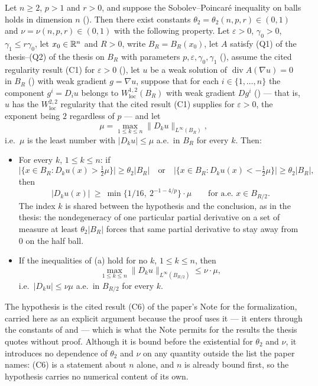 \begin{lemma}[Lemma 3.2]
Let $n\ge2$, $p>1$ and $r>0$, and suppose the Sobolev--Poincar\'e inequality on balls holds in dimension $n$
().  Then there exist constants
$\theta_2=\theta_2(n,p,r)\in(0,1)$ and $\nu=\nu(n,p,r)\in(0,1)$ with the
following property.  Let $\varepsilon>0$, $\gamma_0>0$, $\gamma_1\le r\gamma_0$,
let $x_0\in\mathbb{R}^n$ and $R>0$, write $B_R=B_R(x_0)$,
let $A$ satisfy (Q1) of the thesis--(Q2) of the thesis on $B_R$ with parameters
$p,\varepsilon,\gamma_0,\gamma_1$ (), assume the
cited regularity result (C1) for $\varepsilon>0$
(), let $u$ be a
weak solution of $\operatorname{div}A(\nabla u)=0$ in $B_R$
() with weak gradient $g=\nabla u$, suppose that for
each $i\in\{1,\dots,n\}$ the component $g^i=D_iu$ belongs to
$W^{1,2}_{\mathrm{loc}}(B_R)$ with weak gradient $Dg^i$
() --- that is, $u$ has the $W^{2,2}_{\mathrm{loc}}$
regularity that the cited result (C1) supplies for $\varepsilon>0$, the exponent
being $2$ regardless of $p$ --- and let
\[
\mu=\max_{1\le k\le n}\|D_ku\|_{L^\infty(B_R)} ,
\]
i.e.\ $\mu$ is the least number with $|D_ku|\le\mu$ a.e.\ in $B_R$ for every
$k$.  Then:
\begin{itemize}
\item[\textup{(a)}] For every $k$, $1\le k\le n$: if
\[
\bigl|\{x\in B_R:D_ku(x)>\tfrac12\mu\}\bigr|\ge\theta_2|B_R|
\quad\text{or}\quad
\bigl|\{x\in B_R:D_ku(x)<-\tfrac12\mu\}\bigr|\ge\theta_2|B_R| ,
\]
then
\[
|D_ku(x)|\ \ge\ \min\{1/16,\ 2^{-1-4/p}\}\cdot\mu\qquad\text{for a.e.\ }x\in B_{R/2}.
\]
The index $k$ is shared between the hypothesis and the conclusion, as in the
thesis: the nondegeneracy of one particular partial derivative on a set of
measure at least $\theta_2|B_R|$ forces that same partial derivative to stay
away from $0$ on the half ball.
\item[\textup{(b)}] If the inequalities of \textup{(a)} hold for no $k$,
$1\le k\le n$, then
\[
\max_{1\le k\le n}\|D_ku\|_{L^\infty(B_{R/2})}\le\nu\cdot\mu ,
\]
i.e.\ $|D_ku|\le\nu\mu$ a.e.\ in $B_{R/2}$ for every $k$.
\end{itemize}

The hypothesis  is the cited result (C6) of the
paper's Note for the formalization, carried here as an explicit argument because
the proof uses it --- it enters through the constants of  and  --- which is what the
Note permits for the results the thesis quotes without proof.  Although it is
bound before the existential for $\theta_2$ and $\nu$, it introduces no dependence of
$\theta_2$ and $\nu$ on any quantity outside the list the paper names: (C6) is a statement
about $n$ alone, and $n$ is already bound first, so the hypothesis carries no
numerical content of its own.
\end{lemma}

